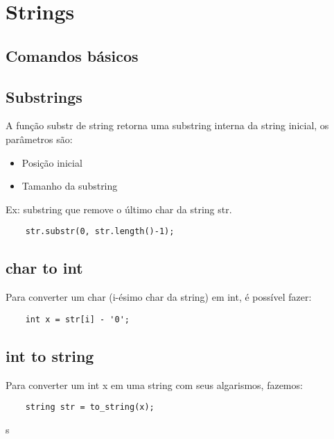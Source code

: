 \section{Strings}

\subsection{Comandos básicos}

\subsection{Substrings}

\par A função substr de string retorna uma substring interna da string inicial, os parâmetros são:
\begin{itemize}
    \item Posição inicial
    \item Tamanho da substring
\end{itemize}
\par Ex: substring que remove o último char da string str.
\begin{verbatim}
    str.substr(0, str.length()-1);
\end{verbatim}

\subsection{char to int}
\par Para converter um char (i-ésimo char da string) em int, é possível fazer:
\begin{verbatim}
    int x = str[i] - '0';
\end{verbatim}

\subsection{int to string}
\par Para converter um int x em uma string com seus algarismos, fazemos:
\begin{verbatim}
    string str = to_string(x);
\end{verbatim}

\pagebreak



s